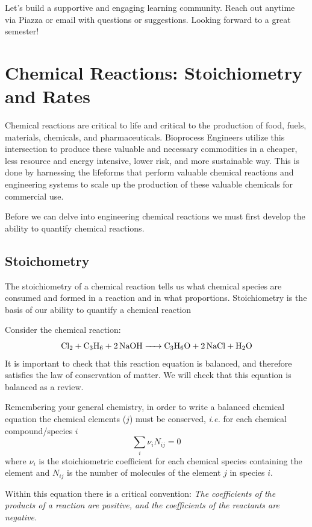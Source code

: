 \documentclass[
]{article}
\begin{document}
Let's build a supportive and engaging learning community. Reach out anytime via Piazza or email with questions or suggestions. Looking forward to a great semester!

\hypertarget{chemical-reactions-stoichiometry-and-rates}{%
\section{Chemical Reactions: Stoichiometry and Rates}\label{chemical-reactions-stoichiometry-and-rates}}

Chemical reactions are critical to life and critical to the production of food, fuels, materials, chemicals, and pharmaceuticals. Bioprocess Engineers utilize this intersection to produce these valuable and necessary commodities in a cheaper, less resource and energy intensive, lower risk, and more sustainable way. This is done by harnessing the lifeforms that perform valuable chemical reactions and engineering systems to scale up the production of these valuable chemicals for commercial use.

Before we can delve into engineering chemical reactions we must first develop the ability to quantify chemical reactions.

\hypertarget{stoichometry}{%
\subsection{Stoichometry}\label{stoichometry}}

The stoichiometry of a chemical reaction tells us what chemical species are consumed and formed in a reaction and in what proportions. Stoichiometry is the basis of our ability to quantify a chemical reaction

Consider the chemical reaction:
\[
\ce{Cl2 + C3H6 + 2NaOH -> C3H6O + 2NaCl + H2O}
\]
It is important to check that this reaction equation is balanced, and therefore satisfies the law of conservation of matter. We will check that this equation is balanced as a review.

Remembering your general chemistry, in order to write a balanced chemical equation the chemical elements (\(j\)) must be conserved, \emph{i.e.}
for each chemical compound/species \(i\)
\[\sum_{i} \nu_i N_{ij} = 0\]
where \(\nu_i\) is the stoichiometric coefficient for each chemical species containing the element and \(N_{ij}\) is the number of molecules of the element \(j\) in species \(i\).

Within this equation there is a critical convention: \emph{The coefficients of the products of a reaction are positive, and the coefficients of the reactants are negative.}
\end{document}
